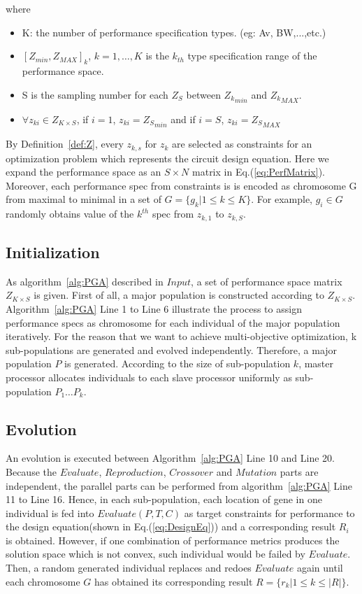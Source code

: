       where
      \begin{itemize}
        \item K: the number of performance specification types. (eg: Av, BW,...,etc.)
        \item $\left[Z_{min},Z_{MAX}\right]_{k}$, $k = 1, \ldots, K$ is the $k_{th}$ type specification range of the performance space.
        \item S is the sampling number for each $Z_S$ between ${Z_k}_{min}$ and ${Z_k}_{MAX}$.
        \item  $\forall z_{ki} \in Z_{K \times S}$, if $i= 1$, $z_{ki}= {Z_S}_{min}$ and if $i = S$, $ z_{ki}={Z_S}_{MAX}$
      \end{itemize}

      By Definition~\ref{def:Z}, every $z_{k,s}$ for $z_k$ are selected as constraints for an optimization problem which represents the circuit design equation. Here we expand the performance space as an $S \times N$ matrix in Eq.(\ref{eq:PerfMatrix}). Moreover, each performance spec from constraints is is encoded as chromosome G from maximal to minimal in a set of $G = \{g_k| 1 \leq k \leq K\}$. For example, $g_i \in G$ randomly obtains value of the $k^{th}$ spec from $z_{k,1}$ to $z_{k,S}$.

    \subsection{Initialization}
      As algorithm~\ref{alg:PGA} described in $Input$, a set of performance space matrix $Z_{K \times S}$ is given. First of all, a major population is constructed according to $Z_{K \times S}$. Algorithm~\ref{alg:PGA} Line 1 to Line 6 illustrate the process to assign performance specs as chromosome for each individual of the major population iteratively. For the reason that we want to achieve multi-objective optimization, k sub-populations are generated and evolved independently. Therefore, a major population $P$ is generated. According to the size of sub-population $k$, master processor allocates individuals to each slave processor uniformly as sub-population $P_1 \ldots P_{k}$. 
  
    \subsection{Evolution}

      An evolution is executed between Algorithm~\ref{alg:PGA} Line 10 and Line 20. Because the $Evaluate$, $Reproduction$, $Crossover$ and $Mutation$ parts are independent, the parallel parts can be performed from algorithm~\ref{alg:PGA} Line 11 to Line 16. Hence, in each sub-population, each location of gene in one individual is fed into $Evaluate(P,T,C)$ as target constraints for performance to the design equation(shown in Eq.(\ref{eq:DesignEq})) and a corresponding result $R_i$ is obtained. However, if one combination of performance metrics produces the solution space which is not convex, such individual would be failed by $Evaluate$. Then, a random generated individual replaces and redoes $Evaluate$ again until each chromosome $G$ has obtained its corresponding result $R = \{r_k| 1 \leq k \leq|R| \}$. 
      
